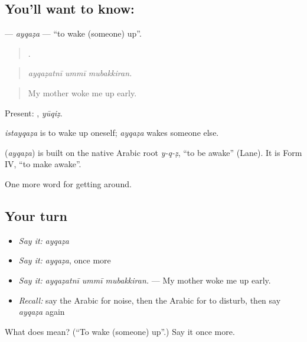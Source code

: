 \subsection*{You'll want to know: }
\textbf{} — \emph{ayqaẓa} — \textquotedblleft{}to wake (someone) up\textquotedblright{}.

\begin{quote}
  .
\end{quote}

\begin{quote}
\emph{ayqaẓatnī ummī mubakkiran.}
\end{quote}

\begin{quote}
My mother woke me up early.
\end{quote}

Present: , \emph{yūqiẓ}.

\emph{istayqaẓa} is to wake up oneself; \emph{ayqaẓa} wakes someone else.

\begin{cousinweb}
\textbf{} (\emph{ayqaẓa}) is built on the native Arabic root \emph{y-q-ẓ}, \textquotedblleft{}to be awake\textquotedblright{} (Lane). It is Form IV, \textquotedblleft{}to make awake\textquotedblright{}.
\end{cousinweb}

\begin{grammarlens}[title={What you've built}]
One more word for getting around.
\end{grammarlens}

\subsection*{Your turn}
\begin{itemize}
\raggedright
  \item \emph{Say it:} \emph{ayqaẓa}
  \item \emph{Say it:} \emph{ayqaẓa}, once more
  \item \emph{Say it:} \emph{ayqaẓatnī ummī mubakkiran.} — My mother woke me up early.
  \item \emph{Recall:} say the Arabic for noise, then the Arabic for to disturb, then say \emph{ayqaẓa} again
\end{itemize}

\begin{tcolorbox}[breakable,colback=teal!4,colframe=teal!35!black,title={Before you move on}]
What does  mean? (\textquotedblleft{}To wake (someone) up\textquotedblright{}.) Say it once more.
\end{tcolorbox}
